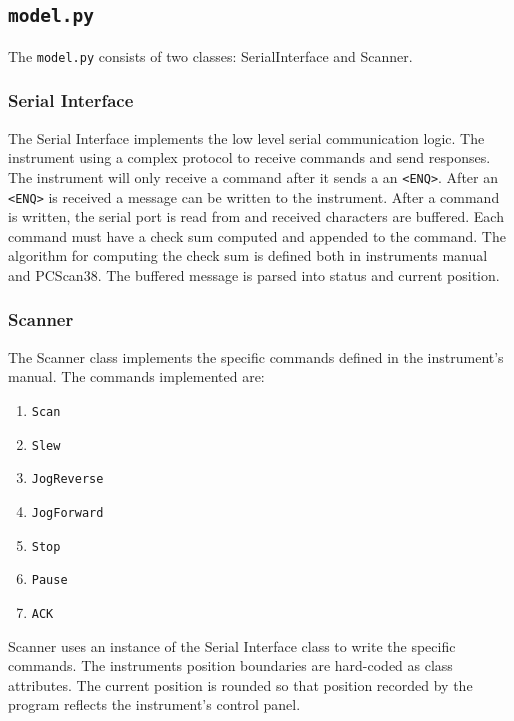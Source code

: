 \documentclass[11pt]{article}
\def\code#1{\texttt{#1}}
\begin{document}
\subsection{\texttt{model.py}}
The \texttt{model.py} consists of two classes: SerialInterface and Scanner.
\subsubsection{Serial Interface}
The Serial Interface implements the low level serial communication logic. The instrument using a complex protocol to receive commands and send responses. The instrument will only receive a command after it sends a an \code{<ENQ>}. After an \code{<ENQ>} is received a message can be written to the instrument. After a command is written, the serial port is read from and received characters are buffered.
Each command must have a check sum computed and appended to the command. The algorithm for computing the check sum is defined both in instruments manual and PCScan38.
The buffered message is parsed into status and current position. 
\subsubsection{Scanner}
The Scanner class implements the specific commands defined in the instrument's manual. The commands implemented are:
\begin{enumerate}
    \item \texttt{Scan}
    \item \texttt{Slew}
    \item \texttt{JogReverse}
    \item \texttt{JogForward}
    \item \texttt{Stop}
    \item \texttt{Pause}
    \item \texttt{ACK}
\end{enumerate}
Scanner uses an instance of the Serial Interface class to write the specific commands.
The instruments position boundaries are hard-coded as class attributes.  
The current position is rounded so that position recorded by the program reflects the instrument's control panel. 
\end{document}

